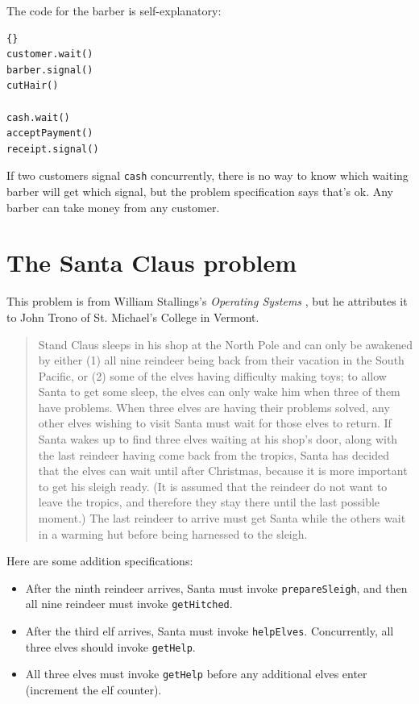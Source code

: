 \documentclass{book}
\newcommand{\clearemptydoublepage}{\newpage\cleardoublepage}
\begin{document}
The code for the barber is self-explanatory:


\begin{lstlisting}[caption={Hilzer's barbershop solution (barber)}]{}
customer.wait()
barber.signal()
cutHair()

cash.wait()
acceptPayment()
receipt.signal()
\end{lstlisting}

If two customers signal {\tt cash} concurrently, there is no
way to know which waiting barber will get which signal, but the
problem specification says that's ok.  Any barber can take
money from any customer.

\clearemptydoublepage
\section{The Santa Claus problem}

This problem is from William Stallings's
{\em Operating Systems} \cite{stallings},
but he attributes it to John Trono of St. Michael's College in
Vermont.

\begin{quotation}
Stand Claus sleeps in his shop at the North Pole and can only be
awakened by either (1) all nine reindeer being back from their
vacation in the South Pacific, or (2) some of the elves having
difficulty making toys; to allow Santa to get some sleep, the elves
can only wake him when three of them have problems.  When three elves
are having their problems solved, any other elves wishing to visit
Santa must wait for those elves to return.  If Santa wakes up to find
three elves waiting at his shop's door, along with the last reindeer
having come back from the tropics, Santa has decided that the elves can
wait until after Christmas, because it is more important to get his
sleigh ready.  (It is assumed that the reindeer do not want to leave
the tropics, and therefore they stay there until the last possible
moment.)  The last reindeer to arrive must get Santa while the others
wait in a warming hut before being harnessed to the sleigh.
\end{quotation}

Here are some addition specifications:

\begin {itemize}

\item After the ninth reindeer arrives, Santa must invoke 
{\tt prepareSleigh}, and then all nine reindeer must
invoke {\tt getHitched}.

\item After the third elf arrives, Santa must invoke {\tt helpElves}.
Concurrently, all three elves should invoke {\tt getHelp}.

\item All three elves must invoke {\tt getHelp} before any additional
elves enter (increment the elf counter).

\end {itemize}
\end{document}
